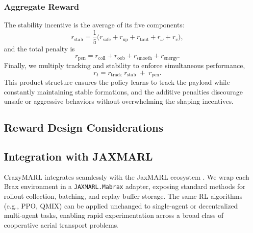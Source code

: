 \subsubsection{Aggregate Reward}
The stability incentive is the average of its five components:
\begin{equation}
r_{\mathrm{stab}}
= \frac{1}{5}\bigl(r_{\mathrm{safe}} + r_{\mathrm{up}} + r_{\mathrm{taut}} + r_{\omega} + r_{v}\bigr),
\end{equation}
and the total penalty is
\begin{equation}
r_{\mathrm{pen}}
= r_{\mathrm{coll}} + r_{\mathrm{oob}} + r_{\mathrm{smooth}} + r_{\mathrm{energy}}.
\end{equation}
Finally, we multiply tracking and stability to enforce simultaneous performance,
\begin{equation}
r_t
= r_{\mathrm{track}}\;r_{\mathrm{stab}}
\;+\;r_{\mathrm{pen}}.
\end{equation}
This product structure ensures the policy learns to track the payload while constantly maintaining stable formations, and the additive penalties discourage unsafe or aggressive behaviors without overwhelming the shaping incentives.

\subsection{Reward Design Considerations}
\subsection{Integration with JAXMARL}

CrazyMARL integrates seamlessly with the JaxMARL ecosystem \cite{flair2023jaxmarl}.  We wrap each Brax environment in a \texttt{JAXMARL.Mabrax} adapter, exposing standard methods for rollout collection, batching, and replay buffer storage.  The same RL algorithms (e.g., PPO, QMIX) can be applied unchanged to single-agent or decentralized multi-agent tasks, enabling rapid experimentation across a broad class of cooperative aerial transport problems.


